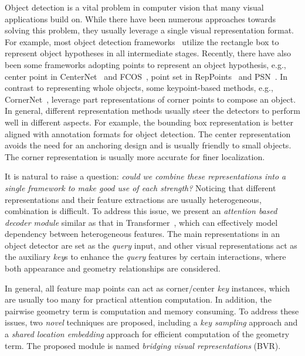\documentclass{article}
\def\eg{{e.g.}}
\begin{document}
Object detection is a vital problem in computer vision that many visual applications build on. While there have been numerous approaches towards solving this problem, they usually leverage a single visual representation format. For example, most object detection frameworks~\cite{girshick2014rich,girshick2015fast,ren2015faster,RetinaNet} utilize the rectangle box to represent object hypotheses in all intermediate stages. Recently, there have also been some frameworks adopting points to represent an object hypothesis, \eg, center point in CenterNet~\cite{CenterNet} and FCOS~\cite{FCOS}, point set in RepPoints~\cite{RepPoints,yang2019dense,chen2020reppointsv2} and PSN~\cite{wei2020point}. 
In contrast to representing whole objects, some keypoint-based methods, \eg, CornerNet~\cite{CornerNet}, leverage part representations of corner points to compose an object. In general, different representation methods usually steer the detectors to perform well in different aspects. For example, the bounding box representation is better aligned with annotation formats for object detection. The center representation avoids the need for an anchoring design and is usually friendly to small objects. The corner representation is usually more accurate for finer localization.

It is natural to raise a question: \emph{could we combine these representations into a single framework to make good use of each strength?} Noticing that different representations and their feature extractions are usually heterogeneous, combination is difficult. To address this issue, we present an \emph{attention based decoder module} similar as that in Transformer~\cite{vaswani2017attention}, which can effectively model dependency between heterogeneous features. The main representations in an object detector are set as the \emph{query} input, and other visual representations act as the auxiliary \emph{key}s to enhance the \emph{query} features by certain interactions, where both appearance and geometry relationships are considered. 

In general, all feature map points can act as corner/center \emph{key} instances, which are usually too many for practical attention computation. In addition, the pairwise geometry term is computation and memory consuming. To address these issues, two \emph{novel} techniques are proposed, including a \emph{key sampling} approach and a \emph{shared location embedding} approach for efficient computation of the geometry term. The proposed module is named \emph{bridging visual representations} (BVR).
\end{document}
